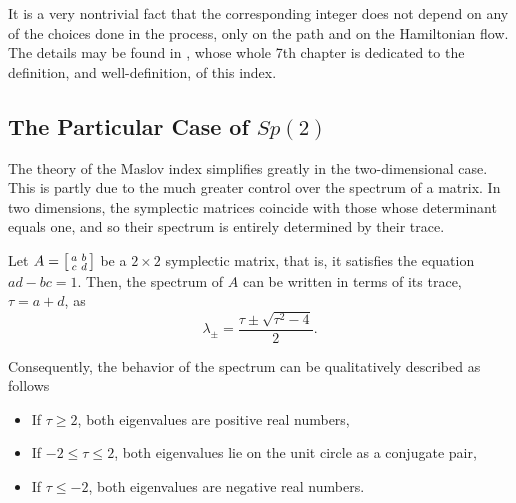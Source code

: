 It is a very nontrivial fact that the corresponding integer does not depend on any of the choices done in the process, only on the path and on the Hamiltonian flow. The details may be found in \cite{audin}, whose whole 7th chapter is dedicated to the definition, and well-definition, of this index.

\subsection{The Particular Case of $Sp(2)$}\label{sec:maslovsp2}

The theory of the Maslov index simplifies greatly in the two-dimensional case. This is partly due to the much greater control over the spectrum of a matrix. In two dimensions, the symplectic matrices coincide with those whose determinant equals one, and so their spectrum is entirely determined by their trace.

\begin{prop}
Let $A = \mleft[\begin{smallmatrix} a & b \\ c & d \end{smallmatrix}\mright]$ be a $2 \times 2$ symplectic matrix, that is, it satisfies the equation $ad - bc = 1$. Then, the spectrum of $A$ can be written in terms of its trace, $\tau = a+d$, as
\begin{equation}\label{lambdafromtau}
\lambda_\pm = \frac{\tau \pm \sqrt{\tau^2 - 4}}2.
\end{equation}

Consequently, the behavior of the spectrum can be qualitatively described as follows
\begin{itemize}
\item If $\tau \geq 2$, both eigenvalues are positive real numbers,
\item If $-2 \leq \tau \leq 2$, both eigenvalues lie on the unit circle as a conjugate pair,
\item If $\tau \leq -2$, both eigenvalues are negative real numbers.
\end{itemize}
\end{prop}

